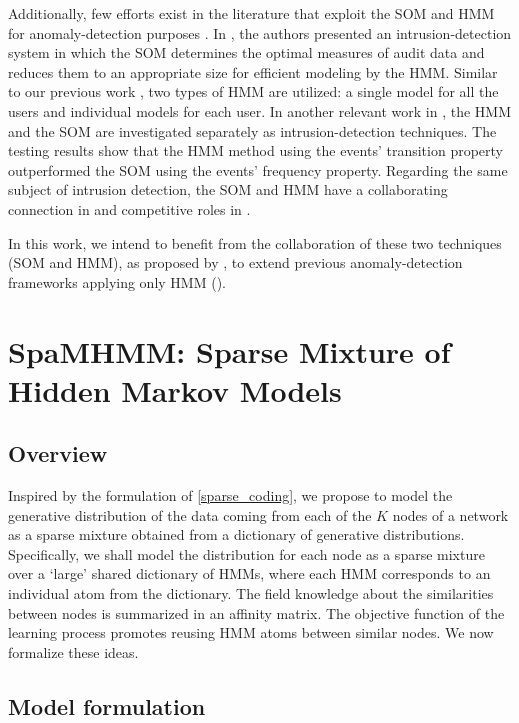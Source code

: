 Additionally, few efforts exist in the literature that exploit the SOM and HMM for anomaly-detection purposes \citet{Ref22,Ref23}. In \citet{Ref22}, the authors presented an intrusion-detection system in which the SOM determines the optimal measures of audit data and reduces them to an appropriate size for efficient modeling by the HMM. Similar to our previous work \citet{Ref5}, two types of HMM are utilized: a single model for all the users and individual models for each user. In another relevant work in \citet{Ref23}, the HMM and the SOM are investigated separately as intrusion-detection techniques. The testing results show that the HMM method using the events' transition property outperformed the SOM using the events' frequency property. Regarding the same subject of intrusion detection, the SOM and HMM have a collaborating connection in \citet{Ref22} and competitive roles in \citet{Ref23}.

In this work, we intend to benefit from the collaboration of these two techniques (SOM and HMM), as proposed by \citet{Ref38}, to extend previous anomaly-detection frameworks applying only HMM (\citet{Ref7,Ref6,Ref5}).

\section{SpaMHMM: Sparse Mixture of Hidden Markov Models}
\label{sec:spamhmm}

\subsection{Overview}

Inspired by the formulation of \eqref{sparse_coding}, we propose to model the generative distribution of the data coming from each of the $K$ nodes of a network as a sparse mixture obtained from a dictionary of generative distributions. Specifically, we shall model the distribution for each node as a sparse mixture over a `large' shared dictionary of HMMs, where each HMM corresponds to an individual atom from the dictionary.
The field knowledge about the similarities between nodes is summarized in an affinity matrix. The objective function of the learning process promotes reusing HMM atoms between similar nodes.
We now formalize these ideas.

\subsection{Model formulation}
